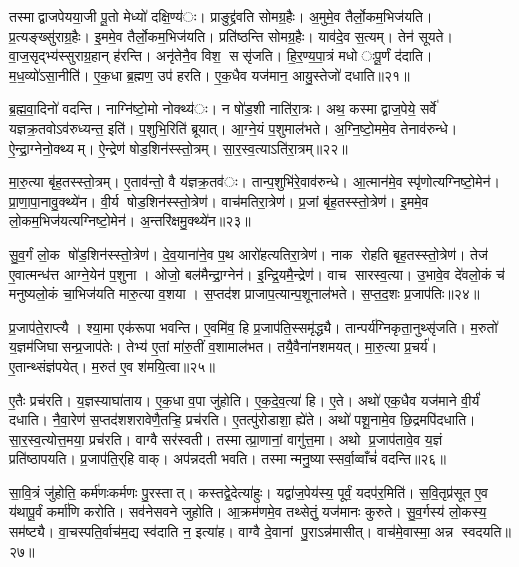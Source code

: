 तस्माद्वाजपेयया॒जी पू॒तो मेध्यो॑ दक्षि॒ण्य॑ः। प्राङुद्द्र॑वति सोमग्र॒हैः। अ॒मुमे॒व तैर्लो॒कम॒भिज॑यति। प्र॒त्यङ्ख्सु॑राग्र॒हैः। इ॒ममे॒व तैर्लो॒कम॒भिज॑यति। प्रति॑ष्ठन्ति सोमग्र॒हैः। याव॑दे॒व स॒त्यम्। तेन॑ सूयते। वा॒ज॒सृद्भ्य॑स्सुराग्र॒हान् ह॑रन्ति। अनृ॑तेनै॒व विश॒ ससृ॑जति। हि॒र॒ण्य॒पा॒त्रं मधोःपू॒र्णं द॑दाति। म॒ध॒व्यो॑ऽसा॒नीति॑। ए॒क॒धा ब्र॒ह्मण॒ उप॑ हरति। ए॒क॒धैव यज॑मान॒ आयु॒स्तेजो॑ दधाति॥२१॥


ब्र॒ह्म॒वा॒दिनो॑ वदन्ति। नाग्नि॑ष्टो॒मो नोक्थ्य॑ः। न षो॑ड॒शी नाति॑रा॒त्रः। अथ॒ कस्माद्वाज॒पेये॒ सर्वे॑ यज्ञक्र॒तवोऽव॑रुध्यन्त॒ इति॑। प॒शुभि॒रिति॑ ब्रूयात्। आ॒ग्ने॒यं प॒शुमाल॑भते। अ॒ग्नि॒ष्टो॒ममे॒व तेनाव॑रुन्धे। ऐ॒न्द्रा॒ग्नेनो॒क्थ्यम्। ऐ॒न्द्रेण॑ षोड॒शिन॑स्स्तो॒त्रम्। सा॒र॒स्व॒त्याऽति॑रा॒त्रम्॥२२॥

मा॒रु॒त्या बृ॑ह॒तस्स्तो॒त्रम्। ए॒ताव॑न्तो॒ वै य॑ज्ञक्र॒तव॑ः। तान्प॒शुभि॑रे॒वाव॑रुन्धे। आ॒त्मान॑मे॒व स्पृ॑णोत्यग्निष्टो॒मेन॑। प्रा॒णा॒पा॒नावु॒क्थ्ये॑न। वी॒र्य षोड॒शिन॑स्स्तो॒त्रेण॑। वाच॑मतिरा॒त्रेण॑। प्र॒जां बृ॑ह॒तस्स्तो॒त्रेण॑। इ॒ममे॒व लो॒कम॒भिज॑यत्यग्निष्टो॒मेन॑। अ॒न्तरि॑क्षमु॒क्थ्ये॑न॥२३॥

सु॒व॒र्गं लो॒क षो॑ड॒शिन॑स्स्तो॒त्रेण॑। दे॒व॒याना॑ने॒व प॒थ आरो॑हत्यतिरा॒त्रेण॑। नाक रोहति बृह॒तस्स्तो॒त्रेण॑। तेज॑ ए॒वात्मन्ध॑त्त आग्ने॒येन॑ प॒शुना। ओजो॒ बल॑मैन्द्रा॒ग्नेन॑। इ॒न्द्रि॒यमै॒न्द्रेण॑। वाच सारस्व॒त्या। उ॒भावे॒व दे॑वलो॒कं च॑ मनुष्यलो॒कं चा॒भिज॑यति मारु॒त्या व॒शया। स॒प्तद॑श प्राजाप॒त्यान्प॒शूनाल॑भते। स॒प्त॒द॒शः प्र॒जाप॑तिः॥२४॥

प्र॒जाप॑ते॒राप्त्यै। श्या॒मा एक॑रूपा भवन्ति। ए॒वमि॑व॒ हि प्र॒जाप॑ति॒स्समृ॑द्ध्यै। तान्पर्य॑ग्निकृता॒नुथ्सृ॑जति। म॒रुतो॑ य॒ज्ञम॑जिघासन्प्र॒जाप॑तेः। तेभ्य॑ ए॒तां मा॑रु॒तीं व॒शामाल॑भत। तयै॒वैना॑नशमयत्। मा॒रु॒त्या प्र॒चर्य॑। ए॒तान्थ्संज्ञ॑पयेत्। म॒रुत॑ ए॒व श॑मयि॒त्वा॥२५॥

ए॒तैः प्रच॑रति। य॒ज्ञस्याघा॑ताय। ए॒क॒धा व॒पा जु॑होति। ए॒क॒दे॒व॒त्या॑ हि। ए॒ते। अथो॑ एक॒धैव यज॑माने वी॒र्यं॑ दधाति। नै॒वा॒रेण॑ स॒प्तद॑शशरावेणै॒तऱ्हि॒ प्रच॑रति। ए॒तत्पु॑रोडाशा॒ ह्ये॑ते। अथो॑ पशू॒नामे॒व छि॒द्रमपि॑दधाति। सा॒र॒स्व॒त्योत्त॒मया॒ प्रच॑रति। वाग्वै सर॑स्वती। तस्मात्प्रा॒णानां॒ वागु॑त्त॒मा। अथो प्र॒जाप॑तावे॒व य॒ज्ञं प्रति॑ष्ठापयति। प्र॒जाप॑ति॒र्‌हि वाक्। अप॑न्नदती भवति। तस्मान्मनु॒ष्यास्सर्वा॒व्वाँचं॑ वदन्ति॥२६॥


सा॒वि॒त्रं जु॑होति॒ कर्म॑णःकर्मणः पु॒रस्तात्। कस्तद्वे॒देत्या॑हुः। यद्वा॑ज॒पेय॑स्य॒ पूर्वं॒ यदप॑र॒मिति॑। स॒वि॒तृप्र॑सूत ए॒व य॑थापू॒र्वं कर्मा॑णि करोति। सव॑नेसवने जुहोति। आ॒क्रम॑णमे॒व तथ्सेतुं॒ यज॑मानः कुरुते। सु॒व॒र्गस्य॑ लो॒कस्य॒ सम॑ष्ट्यै। वा॒चस्पति॒र्वाच॑म॒द्य स्व॑दाति न॒ इत्या॑ह। वाग्वै दे॒वानां पु॒राऽन्न॑मासीत्। वाच॑मे॒वास्मा॒ अन्न स्वदयति॥२७॥

